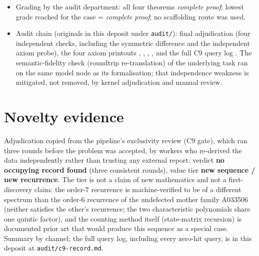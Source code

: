 \documentclass[11pt]{article}
\theoremstyle{definition}
\begin{document}
\begin{itemize}
\item Grading by the audit department: all four theorems \emph{complete
proof}; lowest grade reached for the case = \emph{complete proof}; no
scaffolding route was used.
\item Audit chain (originals in this deposit under \texttt{audit/}): final
adjudication  (four independent checks,
including the symmetric difference and the independent axiom probe), the four
axiom printouts ,
,
,
, and the full C9 query log
. The semantic-fidelity check (roundtrip re-translation)
of the underlying task ran on the same model node as its formalisation; that
independence weakness is mitigated, not removed, by kernel adjudication and
manual review.
\end{itemize}

\section{Novelty evidence}\label{sec:novelty}

Adjudication copied from the pipeline's exclusivity review (C9 gate), which ran
three rounds before the problem was accepted, by workers who re-derived the
data independently rather than trusting any external report: verdict
\textbf{no occupying record found} (three consistent rounds), value tier
\textbf{new sequence / new recurrence}. The tier is not a claim of new
mathematics and not a first-discovery claim: the order-$7$ recurrence is
machine-verified to be of a different spectrum than the order-$6$ recurrence of
the undefected mother family A033506 (neither satisfies the other's recurrence;
the two characteristic polynomials share one quintic factor), and the counting
method itself (state-matrix recursion) is documented prior art that would
produce this sequence as a special case. Summary by channel; the full query
log, including every zero-hit query, is in this deposit at
\texttt{audit/c9-record.md}.
\end{document}

